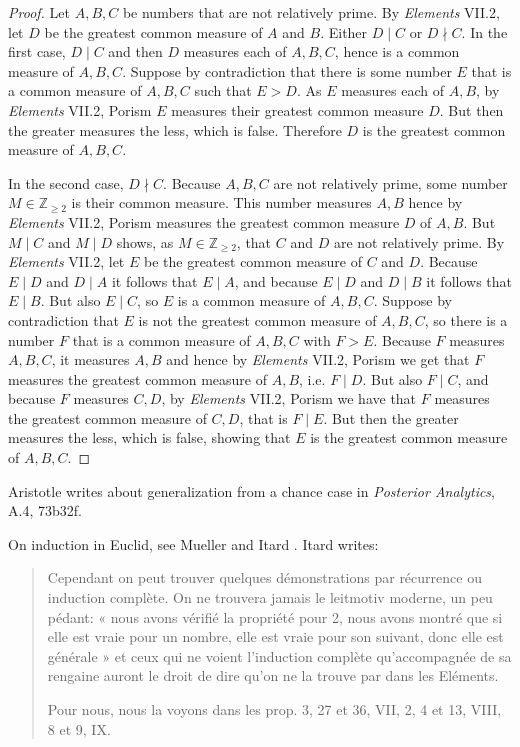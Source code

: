 \documentclass{article}
\begin{document}
\begin{proof}
Let $A,B,C$ be numbers that are not relatively prime. 
By {\em Elements} VII.2, let $D$ be the greatest common measure of $A$ and $B$.
Either $D \mid C$ or $D \nmid C$.
In the first case, $D \mid C$ and then $D$ measures each of $A,B,C$,
hence is a common measure of $A,B,C$. 
Suppose by contradiction that there is some number $E$ that is
a common measure of $A,B,C$ such that $E>D$. 
As $E$ measures each of $A,B$, by {\em Elements} VII.2, Porism $E$ measures their greatest common measure $D$.
But then the greater measures the less, which is false. Therefore $D$ is the greatest common measure of $A,B,C$.

In the second case, $D \nmid C$. Because $A,B,C$ are not relatively prime, some number $M \in \mathbb{Z}_{\geq 2}$ is their common measure. 
This number measures $A,B$ hence by {\em Elements} VII.2, Porism measures the greatest common measure $D$ of $A,B$.
But $M \mid C$ and $M \mid D$ shows, as $M \in \mathbb{Z}_{\geq 2}$, that $C$ and $D$ are not relatively prime. 
By {\em Elements} VII.2, let
 $E$ be the greatest common measure of $C$ and $D$. 
 Because $E \mid D$ and $D \mid A$ it follows that $E \mid A$, and because $E \mid D$ and $D \mid B$ it follows that $E \mid B$. 
 But also $E \mid C$, so $E$ is a common measure of $A,B,C$. Suppose by contradiction that
 $E$ is not the greatest common measure of $A,B,C$, so there is a number $F$ that is a common measure of $A,B,C$ with
 $F>E$. Because $F$ measures $A,B,C$, it measures $A,B$ and hence by {\em Elements} VII.2, Porism we get that
 $F$ measures the greatest common measure of $A,B$, i.e. $F \mid D$.
But also $F \mid C$, and because $F$ measures $C,D$, by {\em Elements} VII.2, Porism we have that
$F$ measures the greatest common measure of $C,D$, that is $F \mid E$. But then the greater measures the less, which is false, showing
that $E$ is the greatest common measure of $A,B,C$. 
\end{proof}


Aristotle writes about generalization from a chance case in {\em Posterior Analytics}, A.4, 73b32f.

On induction in Euclid, see Mueller \cite[pp.~68--69]{mueller} and  Itard \cite{itard}. Itard \cite[p.~73]{itard} writes:

\begin{quote}
Cependant on peut trouver quelques d\'emonstrations par r\'ecurrence
ou induction compl\`ete. On ne trouvera jamais le leitmotiv
moderne, un peu p\'edant: «  nous avons v\'erifi\'e la propri\'et\'e pour 2,
nous avons montr\'e que si elle est vraie pour un nombre, elle est vraie
pour son suivant, donc elle est g\'en\'erale » et ceux qui ne voient
l'induction compl\`ete qu'accompagn\'ee de sa rengaine auront le droit
de dire qu'on ne la trouve par dans les El\'ements.

Pour nous, nous la voyons dans les prop. 3, 27 et 36, VII, 2, 4 et 13, VIII, 8 et 9, IX.
\end{quote}
\end{document}
